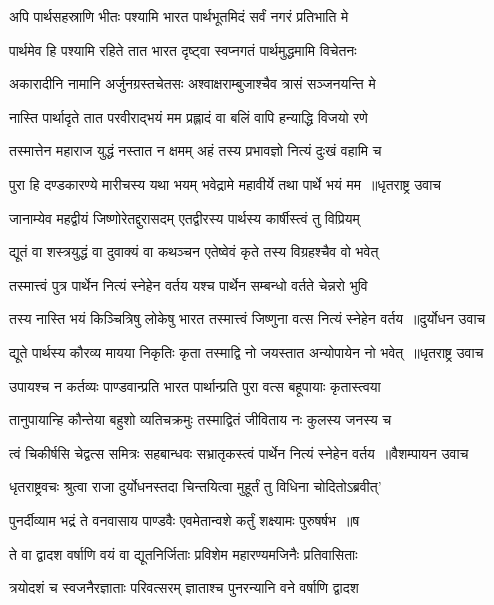 \twolineshloka
{अपि पार्थसहस्राणि भीतः पश्यामि भारत}
{पार्थभूतमिदं सर्वं नगरं प्रतिभाति मे}


\twolineshloka
{पार्थमेव हि पश्यामि रहिते तात भारत}
{दृष्ट्वा स्वप्नगतं पार्थमुद्धमामि विचेतनः}


\twolineshloka
{अकारादीनि नामानि अर्जुनग्रस्तचेतसः}
{अश्वाक्षराम्बुजाश्चैव त्रासं सञ्जनयन्ति मे}


\twolineshloka
{नास्ति पार्थादृते तात परवीराद्भयं मम}
{प्रह्लादं वा बलिं वापि हन्याद्धि विजयो रणे}


\twolineshloka
{तस्मात्तेन महाराज युद्धं नस्तात न क्षमम्}
{अहं तस्य प्रभावज्ञो नित्यं दुःखं वहामि च}


\twolineshloka
{पुरा हि दण्डकारण्ये मारीचस्य यथा भयम्}
{भवेद्रामे महावीर्ये तथा पार्थे भयं मम ॥धृतराष्ट्र उवाच}


\twolineshloka
{जानाम्येव महद्वीयं जिष्णोरेतद्दुरासदम्}
{एतद्वीरस्य पार्थस्य कार्षीस्त्वं तु विप्रियम्}


\twolineshloka
{द्यूतं वा शस्त्रयुद्धं वा दुवाक्यं वा कथञ्चन}
{एतेष्वेवं कृते तस्य विग्रहश्चैव वो भवेत्}


\twolineshloka
{तस्मात्त्वं पुत्र पार्थेन नित्यं स्नेहेन वर्तय}
{यश्च पार्थेन सम्बन्धो वर्तते चेन्नरो भुवि}


\twolineshloka
{तस्य नास्ति भयं किञ्चित्रिषु लोकेषु भारत}
{तस्मात्त्वं जिष्णुना वत्स नित्यं स्नेहेन वर्तय ॥दुर्योधन उवाच}


\twolineshloka
{द्यूते पार्थस्य कौरव्य मायया निकृतिः कृता}
{तस्माद्वि नो जयस्तात अन्योपायेन नो भवेत् ॥धृतराष्ट्र उवाच}


\twolineshloka
{उपायश्च न कर्तव्यः पाण्डवान्प्रति भारत}
{पार्थान्प्रति पुरा वत्स बहूपायाः कृतास्त्वया}


\twolineshloka
{तानुपायान्हि कौन्तेया बहुशो व्यतिचक्रमुः}
{तस्माद्वितं जीविताय नः कुलस्य जनस्य च}


\twolineshloka
{त्वं चिकीर्षसि चेद्वत्स समित्रः सहबान्धवः}
{सभ्रातृकस्त्वं पार्थेन नित्यं स्नेहेन वर्तय ॥वैशम्पायन उवाच}


\twolineshloka
{धृतराष्ट्रवचः श्रुत्वा राजा दुर्योधनस्तदा}
{चिन्तयित्वा मुहूर्तं तु विधिना चोदितोऽब्रवीत्'}


\twolineshloka
{पुनर्दीव्याम भद्रं ते वनवासाय पाण्डवैः}
{एवमेतान्वशे कर्तुं शक्ष्यामः पुरुषर्षभ ॥ष}


\twolineshloka
{ते वा द्वादश वर्षाणि वयं वा द्यूतनिर्जिताः}
{प्रविशेम महारण्यमजिनैः प्रतिवासिताः}


\twolineshloka
{त्रयोदशं च स्वजनैरज्ञाताः परिवत्सरम्}
{ज्ञाताश्च पुनरन्यानि वने वर्षाणि द्वादश}


